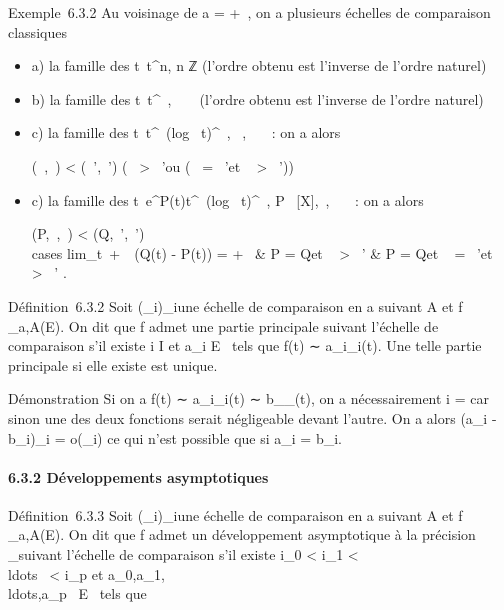 \documentclass[]{article}
\begin{document}
Exemple~6.3.2 Au voisinage de a = +\infty~, on a plusieurs échelles de
comparaison classiques

\begin{itemize}
\item
  a) la famille des t\mapsto~t^n, n \in ℤ
  (l'ordre obtenu est l'inverse de l'ordre naturel)
\item
  b) la famille des t\mapsto~t^\alpha~, \alpha~ \in {}~
  (l'ordre obtenu est l'inverse de l'ordre naturel)
\item
  c) la famille des
  t\mapsto~t^\alpha~(log~
  t)^\beta~, \alpha~,\beta~ \in {}~~: on a alors

  (\alpha~,\beta~) \textless{} (\alpha~',\beta~') \Leftrightarrow
  \bigl (\alpha~ \textgreater{} \alpha~'\text ou
  (\alpha~ = \alpha~'\text et \beta~ \textgreater{}
  \beta~')\bigr )
\item
  c) la famille des
  t\mapsto~e^P(t)t^\alpha~(log~
  t)^\beta~, P \in {}~{[}X{]},\alpha~,\beta~ \in {}~~: on a alors

  (P,\alpha~,\beta~) \textless{} (Q,\alpha~',\beta~') \Leftrightarrow
  \left \\cases
  lim\_t\rightarrow~+\infty~~(Q(t) - P(t)) = +\infty~
  \cr \cr \textou &
  \cr P = Q\text et \alpha~ \textgreater{}
  \alpha~' \cr \textou & \cr
  P = Q\text et \alpha~ = \alpha~'\text et \beta~
  \textgreater{} \beta~'  \right .
\end{itemize}

Définition~6.3.2 Soit (\phi\_i)\_i\inI une échelle de
comparaison en a suivant A et f \_a,A(E). On dit que f admet
une partie principale suivant l'échelle de comparaison s'il existe i \in I
et a\_i \in E \diagdown\0\ tels que f(t)
∼ a\_i\phi\_i(t). Une telle partie principale si elle
existe est unique.

Démonstration Si on a f(t) ∼ a\_i\phi\_i(t) ∼
b\_\jmath\phi\_\jmath(t), on a nécessairement i = \jmath car sinon une des
deux fonctions serait négligeable devant l'autre. On a alors
(a\_i - b\_i)\phi\_i = o(\phi\_i) ce qui n'est
possible que si a\_i = b\_i.

\paragraph{6.3.2 Développements asymptotiques}

Définition~6.3.3 Soit (\phi\_i)\_i\inI une échelle de
comparaison en a suivant A et f \_a,A(E). On dit que f admet
un développement asymptotique à la précision \phi\_\jmath suivant
l'échelle de comparaison s'il existe i\_0 \textless{}
i\_1 \textless{}
\\ldots~ \textless{}
i\_p \leq \jmath et
a\_0,a\_1,\\ldots,a\_p~
\in E \diagdown\0\ tels que
\end{document}
